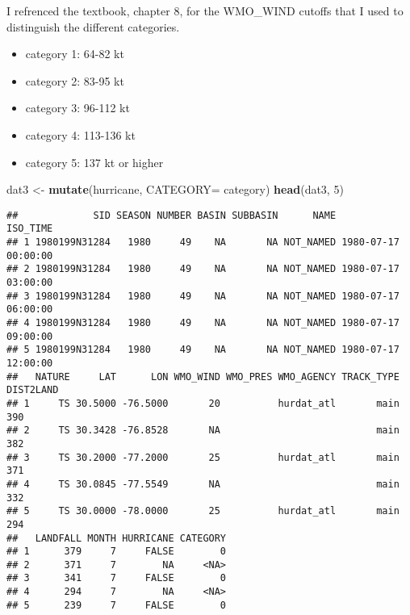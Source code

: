 \documentclass[
]{article}
\newenvironment{Shaded}{\begin{snugshade}}{\end{snugshade}}
\newcommand{\DataTypeTok}[1]{\textcolor[rgb]{0.13,0.29,0.53}{#1}}
\newcommand{\DecValTok}[1]{\textcolor[rgb]{0.00,0.00,0.81}{#1}}
\newcommand{\KeywordTok}[1]{\textcolor[rgb]{0.13,0.29,0.53}{\textbf{#1}}}
\newcommand{\NormalTok}[1]{#1}
\newcommand{\OperatorTok}[1]{\textcolor[rgb]{0.81,0.36,0.00}{\textbf{#1}}}
\newcommand{\OtherTok}[1]{\textcolor[rgb]{0.56,0.35,0.01}{#1}}
\newcommand{\StringTok}[1]{\textcolor[rgb]{0.31,0.60,0.02}{#1}}
\providecommand{\tightlist}{%
  \setlength{\itemsep}{0pt}\setlength{\parskip}{0pt}}
\begin{document}
I refrenced the textbook, chapter 8, for the WMO\_WIND cutoffs that I
used to distinguish the different categories.

\begin{itemize}
\tightlist
\item
  category 1: 64-82 kt
\item
  category 2: 83-95 kt
\item
  category 3: 96-112 kt
\item
  category 4: 113-136 kt
\item
  category 5: 137 kt or higher
\end{itemize}

\begin{Shaded}
\end{Shaded}

\begin{Shaded}
\begin{Highlighting}[]
\NormalTok{dat3 <-}\StringTok{ }\KeywordTok{mutate}\NormalTok{(hurricane, }\DataTypeTok{CATEGORY=}\NormalTok{ category)}
\KeywordTok{head}\NormalTok{(dat3, }\DecValTok{5}\NormalTok{)}
\end{Highlighting}
\end{Shaded}

\begin{verbatim}
##             SID SEASON NUMBER BASIN SUBBASIN      NAME            ISO_TIME
## 1 1980199N31284   1980     49    NA       NA NOT_NAMED 1980-07-17 00:00:00
## 2 1980199N31284   1980     49    NA       NA NOT_NAMED 1980-07-17 03:00:00
## 3 1980199N31284   1980     49    NA       NA NOT_NAMED 1980-07-17 06:00:00
## 4 1980199N31284   1980     49    NA       NA NOT_NAMED 1980-07-17 09:00:00
## 5 1980199N31284   1980     49    NA       NA NOT_NAMED 1980-07-17 12:00:00
##   NATURE     LAT      LON WMO_WIND WMO_PRES WMO_AGENCY TRACK_TYPE DIST2LAND
## 1     TS 30.5000 -76.5000       20          hurdat_atl       main       390
## 2     TS 30.3428 -76.8528       NA                           main       382
## 3     TS 30.2000 -77.2000       25          hurdat_atl       main       371
## 4     TS 30.0845 -77.5549       NA                           main       332
## 5     TS 30.0000 -78.0000       25          hurdat_atl       main       294
##   LANDFALL MONTH HURRICANE CATEGORY
## 1      379     7     FALSE        0
## 2      371     7        NA     <NA>
## 3      341     7     FALSE        0
## 4      294     7        NA     <NA>
## 5      239     7     FALSE        0
\end{verbatim}
\end{document}
